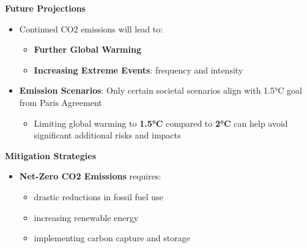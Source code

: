 \documentclass[fontsize=8pt, a4paper, landscape, fleqn]{scrartcl}
\renewcommand{\subsection}[1]{%
    \noindent\colorbox{subsectioncolor}{%
        \parbox{\dimexpr\columnwidth-2\fboxsep}{\color{white}\textbf{#1}}}%
    \vspace{0.5mm}%
}
\begin{document}
\begin{multicols*}{3}[\raggedcolumns]
\subsection{Future Projections}
\begin{itemize}
    \item Continued CO2 emissions will lead to:
        \begin{itemize}
            \item \textbf{Further Global Warming}
            \item \textbf{Increasing Extreme Events}: frequency and intensity
        \end{itemize}
    \item \textbf{Emission Scenarios}: Only certain societal scenarios align with 1.5°C goal from Paris Agreement
        \begin{itemize}
            \item Limiting global warming to \textbf{1.5°C} compared to \textbf{2°C} can help avoid significant additional risks and impacts
        \end{itemize}
\end{itemize}

\subsection{Mitigation Strategies}
\begin{itemize}
    \item \textbf{Net-Zero CO2 Emissions} requires:
        \begin{itemize}
            \item drastic reductions in fossil fuel use
            \item increasing renewable energy
            \item implementing carbon capture and storage
        \end{itemize}
\end{itemize}


\end{multicols*}
\end{document}
